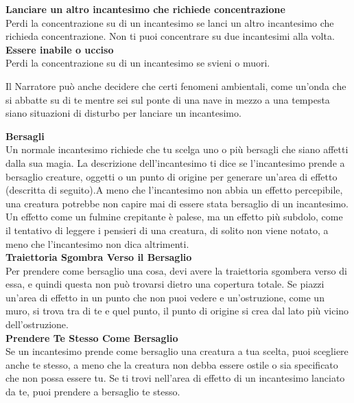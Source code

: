 \textbf{Lanciare un altro incantesimo che richiede concentrazione}\\
Perdi la concentrazione su di un incantesimo se lanci un altro incantesimo  che richieda concentrazione. Non ti puoi concentrare su due incantesimi alla volta. \\

\textbf{Essere inabile o ucciso}\\
Perdi la concentrazione su di un incantesimo se svieni o muori.\\

\medskip

Il Narratore può anche decidere che certi fenomeni ambientali, come un'onda che si abbatte su di te mentre sei sul ponte di una nave in mezzo a una tempesta siano situazioni di disturbo per lanciare un incantesimo.\\
\medskip

\textbf{Bersagli}\\
Un normale incantesimo richiede che tu scelga uno o più bersagli che siano affetti dalla sua magia. La descrizione dell'incantesimo ti dice se l'incantesimo prende a bersaglio creature, oggetti o un punto di origine per generare un'area di effetto (descritta di  seguito).A meno che l'incantesimo non abbia un effetto  percepibile, una creatura potrebbe non capire mai di essere stata bersaglio di un incantesimo. Un effetto come un fulmine crepitante è palese, ma un effetto più subdolo, come il tentativo di leggere i pensieri di una creatura, di solito non viene notato, a meno che l'incantesimo non dica altrimenti.\\

\textbf{Traiettoria Sgombra Verso il Bersaglio}\\
Per prendere come bersaglio una cosa, devi avere la traiettoria sgombera verso di essa, e quindi questa non può trovarsi dietro una copertura totale. Se piazzi un'area di effetto in un punto che non puoi vedere e un'ostruzione, come un muro, si trova tra di te e quel punto, il punto di origine si crea dal lato più vicino dell'ostruzione.\\

\textbf{Prendere Te Stesso Come Bersaglio} \\
Se un incantesimo prende come bersaglio una creatura a tua scelta, puoi scegliere anche te stesso, a meno che la creatura non debba essere ostile o sia specificato che non possa essere tu. Se ti trovi nell'area  di effetto di un incantesimo lanciato da te, puoi  prendere a bersaglio te stesso.\\


